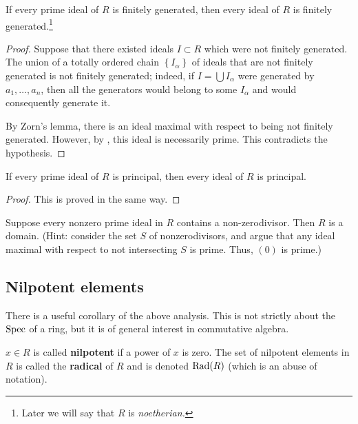 \begin{corollary}[Cohen]
If every prime ideal of $R$ is finitely generated, then every ideal of $R$ is
finitely generated.\footnote{Later we will say that $R$ is \emph{noetherian.}} 
\end{corollary} 

\begin{proof} 
Suppose that there existed ideals $I \subset R$ which were not finitely
generated.
The union of a totally ordered chain $\left\{I_\alpha\right\}$ of ideals that are not finitely generated is not finitely
generated; indeed, if $I = \bigcup I_\alpha$ were generated by $a_1, \dots,
a_n$, then all the generators would belong to some $I_\alpha $ and would
consequently generate it.

By Zorn's lemma, there is an ideal maximal with respect to being not finitely
generated. However, by , this ideal is necessarily
prime. This contradicts the hypothesis.
\end{proof} 

\begin{corollary} 
If every prime ideal of $R$ is principal, then every ideal of $R$ is principal.
\end{corollary} 
\begin{proof} 
This is proved in the same way.
\end{proof} 

\begin{exercise} 
Suppose every nonzero prime ideal in $R$ contains a non-zerodivisor. Then $R$
is a domain. (Hint: consider the set $S$ of nonzerodivisors, and argue that
any ideal maximal with respect to not intersecting $S$ is prime. Thus, $(0)$
is prime.)
\end{exercise} 

\subsection{Nilpotent elements}

There is a useful corollary of the above analysis. This is not strictly about
the $\operatorname{Spec}$ of a ring, but it is of general interest in commutative algebra. 

\begin{definition} 
 $x \in R$ is called \textbf{nilpotent} if a power of $x$ is zero. The set of
 nilpotent elements in $R$ is called the \textbf{radical} of $R$ and is denoted
 $\operatorname{Rad}(R)$ (which is an abuse of notation).
\end{definition}


